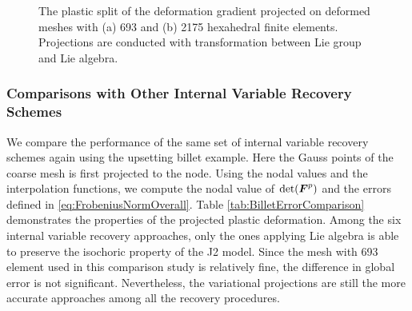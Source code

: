 \documentclass[12pt]{article}
\begin{document}
\begin{figure}[htbp]
  \begin{center}
    \unitlength=1.0mm
    \caption{The plastic split of the deformation gradient projected
      on deformed meshes with (a) 693 and (b) 2175 hexahedral finite
      elements. Projections are conducted with transformation between
      Lie group and Lie algebra.}
    \label{fig:BilletWLie}
  \end{center}
\end{figure}

\subsubsection{Comparisons with Other Internal Variable Recovery Schemes}
We compare the performance of the same set of internal variable recovery schemes again using
the upsetting billet example. Here the Gauss points of the coarse mesh is first projected 
 to the node. Using the nodal values and the interpolation functions, we compute the nodal 
 value of $\det({\boldsymbol{F}}^{p})$ and the errors defined in \eqref{eq:FrobeniusNormOverall}. Table \ref{tab:BilletErrorComparison} demonstrates the properties of the projected plastic deformation. 
 Among the six internal variable recovery approaches, only the ones applying Lie algebra is able to preserve
 the isochoric property of the J2 model. Since the mesh with 693 element used in this comparison study is relatively fine, the difference in global error is not significant. Nevertheless,  the variational projections are still the more accurate approaches among all the recovery procedures.  
 
\end{document}
